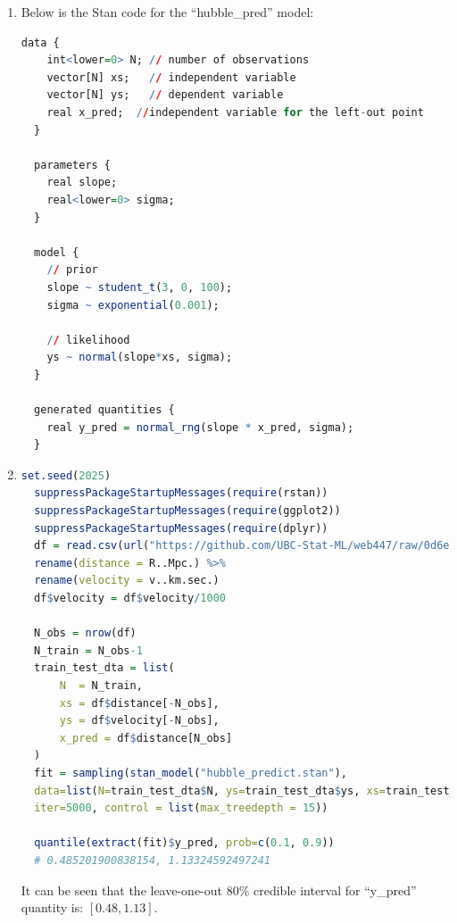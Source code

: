 \documentclass{article}
\begin{document}



\begin{enumerate}
\item 
Below is the Stan code for the ``hubble\_pred'' model:
\begin{lstlisting}[language=R]
  data {
    int<lower=0> N; // number of observations
    vector[N] xs;   // independent variable
    vector[N] ys;   // dependent variable
    real x_pred;  //independent variable for the left-out point
  }

  parameters {
    real slope;
    real<lower=0> sigma;
  }

  model {
    // prior
    slope ~ student_t(3, 0, 100);
    sigma ~ exponential(0.001);

    // likelihood
    ys ~ normal(slope*xs, sigma);
  }

  generated quantities {
    real y_pred = normal_rng(slope * x_pred, sigma); 
  }
\end{lstlisting}


\item 
\begin{lstlisting}[language=R]
  set.seed(2025)
  suppressPackageStartupMessages(require(rstan))
  suppressPackageStartupMessages(require(ggplot2))
  suppressPackageStartupMessages(require(dplyr))
  df = read.csv(url("https://github.com/UBC-Stat-ML/web447/raw/0d6eaa346d78abe4cd125e8fc688c9074d6331d9/data/hubble-1.csv")) %>%
  rename(distance = R..Mpc.) %>%
  rename(velocity = v..km.sec.)
  df$velocity = df$velocity/1000

  N_obs = nrow(df)
  N_train = N_obs-1
  train_test_dta = list(
      N  = N_train,
      xs = df$distance[-N_obs], 
      ys = df$velocity[-N_obs], 
      x_pred = df$distance[N_obs]
  )
  fit = sampling(stan_model("hubble_predict.stan"), 
  data=list(N=train_test_dta$N, ys=train_test_dta$ys, xs=train_test_dta$xs, x_pred=train_test_dta$x_pred), 
  iter=5000, control = list(max_treedepth = 15))

  quantile(extract(fit)$y_pred, prob=c(0.1, 0.9))
  # 0.485201900838154, 1.13324592497241
\end{lstlisting}
It can be seen that the leave-one-out $80\%$ credible interval for ``y\_pred'' quantity is: $[0.48, 1.13]$.


\end{enumerate}
\end{document}
